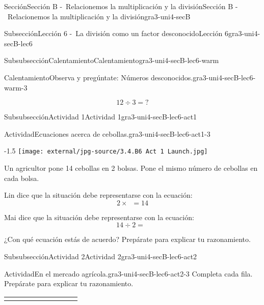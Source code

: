\documentclass[twoside,10pt,]{article}
\newcommand{\tabularfont}{\relax}
\newcommand{\hrulethin}  {\noalign{\hrule height 0.04em}}
\begin{document}
\begin{sectionptx}{Sección}{Sección B -~Relacionemos la multiplicación y la división}{}{Sección B -~Relacionemos la multiplicación y la división}{}{}{gra3-uni4-secB}
\begin{subsectionptx}{Subsección}{Lección 6 -~La división como un factor desconocido}{}{Lección 6}{}{}{gra3-uni4-secB-lec6}
\begin{subsubsectionptx}{Subsubsección}{Calentamiento}{}{Calentamiento}{}{}{gra3-uni4-secB-lec6-warm}
\begin{exploration}{Calentamiento}{Observa y pregúntate: Números desconocidos.}{gra3-uni4-secB-lec6-warm-3}
\begin{sidebyside}{2}{0}{0}{0}
\begin{sbspanel}{0.5}%
\par
%
\begin{equation*}
12\div 3 ={?}
\end{equation*}
%
\end{sbspanel}%
\end{sidebyside}%
\end{exploration}%
\end{subsubsectionptx}
%
%
\typeout{************************************************}
\typeout{************************************************}
%
\begin{subsubsectionptx}{Subsubsección}{Actividad 1}{}{Actividad 1}{}{}{gra3-uni4-secB-lec6-act1}
\begin{activity}{Actividad}{Ecuaciones acerca de cebollas.}{gra3-uni4-secB-lec6-act1-3}%
\begin{image}{0.15}{0.7}{0.15}{-1.5\baselineskip}%
\texttt{[image: external/jpg-source/3.4.B6 Act 1 Launch.jpg]}
\end{image}%
Un agricultor pone 14 cebollas en 2 bolsas. Pone el mismo número de cebollas en cada bolsa.%
\par
Lin dice que la situación debe representarse con la ecuación:%
\begin{equation*}
2 \times \boxed{\phantom{3}} = 14
\end{equation*}
%
\par
Mai dice que la situación debe representarse con la ecuación:%
\begin{equation*}
14 \div 2 = \boxed{\phantom{3}}
\end{equation*}
%
\par
¿Con qué ecuación estás de acuerdo? Prepárate para explicar tu razonamiento.%
\end{activity}%
\end{subsubsectionptx}
%
%
\typeout{************************************************}
\typeout{************************************************}
%
\begin{subsubsectionptx}{Subsubsección}{Actividad 2}{}{Actividad 2}{}{}{gra3-uni4-secB-lec6-act2}
\begin{activity}{Actividad}{En el mercado agrícola.}{gra3-uni4-secB-lec6-act2-3}%
Completa cada fila. Prepárate para explicar tu razonamiento.%
\begin{center}%
{\tabularfont%
\begin{tabular}{AlAcAcAcA}\hrulethin

\end{tabular}}
\end{center}
\end{activity}
\end{subsubsectionptx}
\end{subsectionptx}
\end{sectionptx}
\end{document}
